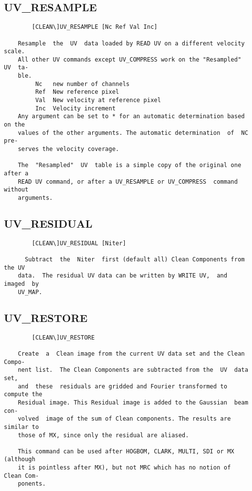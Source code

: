 \subsection{UV\_RESAMPLE}
\begin{verbatim}
        [CLEAN\]UV_RESAMPLE [Nc Ref Val Inc]

    Resample  the  UV  data loaded by READ UV on a different velocity scale.
    All other UV commands except UV_COMPRESS work on the "Resampled" UV  ta-
    ble.
         Nc   new number of channels
         Ref  New reference pixel
         Val  New velocity at reference pixel
         Inc  Velocity increment
    Any argument can be set to * for an automatic determination based on the
    values of the other arguments. The automatic determination  of  NC  pre-
    serves the velocity coverage.

    The  "Resampled"  UV  table is a simple copy of the original one after a
    READ UV command, or after a UV_RESAMPLE or UV_COMPRESS  command  without
    arguments.

\end{verbatim}
\subsection{UV\_RESIDUAL}
\begin{verbatim}
        [CLEAN\]UV_RESIDUAL [Niter]

      Subtract  the  Niter  first (default all) Clean Components from the UV
    data.  The residual UV data can be written by WRITE UV,  and  imaged  by
    UV_MAP.

\end{verbatim}
\subsection{UV\_RESTORE}
\begin{verbatim}
        [CLEAN\]UV_RESTORE

    Create  a  Clean image from the current UV data set and the Clean Compo-
    nent list.  The Clean Components are subtracted from the  UV  data  set,
    and  these  residuals are gridded and Fourier transformed to compute the
    Residual image. This Residual image is added to the Gaussian  beam  con-
    volved  image of the sum of Clean components. The results are similar to
    those of MX, since only the residual are aliased.

    This command can be used after HOGBOM, CLARK, MULTI, SDI or MX (although
    it is pointless after MX), but not MRC which has no notion of Clean Com-
    ponents.

\end{verbatim}
